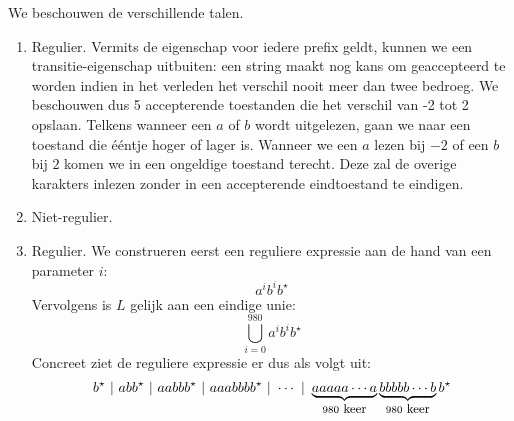\documentclass{article}
\begin{document}
\begin{answer}
We beschouwen de verschillende talen.
\begin{enumerate}
 \item Regulier. Vermits de eigenschap voor iedere prefix geldt, kunnen we een transitie-eigenschap uitbuiten: een string maakt nog kans om geaccepteerd te worden indien in het verleden het verschil nooit meer dan twee bedroeg. We beschouwen dus 5 accepterende toestanden die het verschil van -2 tot 2 opslaan. Telkens wanneer een $a$ of $b$ wordt uitgelezen, gaan we naar een toestand die \'e\'entje hoger of lager is. Wanneer we een $a$ lezen bij $-2$ of een $b$ bij $2$ komen we in een ongeldige toestand terecht. Deze zal de overige karakters inlezen zonder in een accepterende eindtoestand te eindigen.\\
 \begin{center}
 \end{center}
 \item Niet-regulier.
 \item Regulier. We construeren eerst een reguliere expressie aan de hand van een parameter $i$:
 \begin{equation}
  a^ib^ib^\star
 \end{equation}
 Vervolgens is $L$ gelijk aan een eindige unie:
 \begin{equation}
  \displaystyle\bigcup_{i=0}^{980} a^ib^ib^\star
 \end{equation}
Concreet ziet de reguliere expressie er dus als volgt uit:
\begin{equation}
 b^\star\ |\ abb^\star\ |\ aabbb^\star\ |\ aaabbbb^\star\ |\ \cdots\ |\ \underbrace{aaaaa\cdots a}_{980\mbox{\small{ keer}}}\underbrace{bbbbb\cdots b}_{980\mbox{\small{ keer}}}b^\star
\end{equation}


\end{enumerate}
\end{answer}
\end{document}
